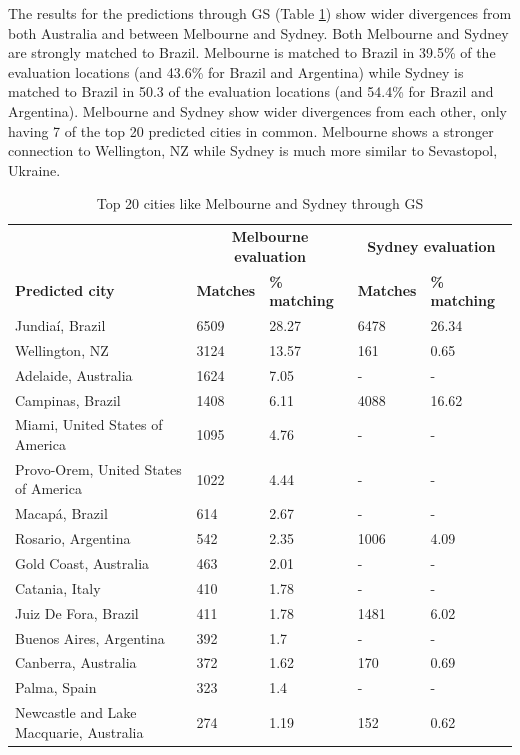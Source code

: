 \documentclass[sageh,times]{sagej}
\begin{document}
The results for the predictions through GS (Table \ref{tab:melbournesydneyGS}) show wider divergences from both Australia and between Melbourne and Sydney. Both Melbourne and Sydney are strongly matched to Brazil. Melbourne is matched to Brazil in 39.5\% of the evaluation locations (and 43.6\% for Brazil and Argentina) while Sydney is matched to Brazil in 50.3 of the evaluation locations (and 54.4\% for Brazil and Argentina). Melbourne and Sydney show wider divergences from each other, only having 7 of the top 20 predicted cities in common. Melbourne shows a stronger connection to Wellington, NZ while Sydney is much more similar to Sevastopol, Ukraine.

\begin{table}[!htbp]
\caption{Top 20 cities like Melbourne and Sydney through GS \label{tab:melbournesydneyGS}}     
\begin{tabular}{| l | l |l| l | l|}
\hline
 \hline    &  \multicolumn{2}{c|}{\textbf{Melbourne evaluation}} & \multicolumn{2}{c|}{\textbf{Sydney evaluation}}  \\  
\textbf{Predicted city} & \textbf{Matches} & \textbf{\% matching}  & \textbf{Matches} & \textbf{\% matching}\\ \hline
Jundia\'{i}, Brazil & 6509 & 28.27 & 6478 & 26.34 \\ \hline
Wellington, NZ & 3124 & 13.57 & 161 & 0.65 \\ \hline
Adelaide, Australia & 1624 & 7.05 &-&- \\ \hline
Campinas, Brazil & 1408 & 6.11 & 4088 & 16.62 \\ \hline
Miami, United States of America & 1095 & 4.76 &-&- \\ \hline
Provo-Orem, United States of America & 1022 & 4.44 &-&- \\ \hline
Macap\'{a}, Brazil & 614 & 2.67 &-&- \\ \hline
Rosario, Argentina & 542 & 2.35 & 1006 & 4.09 \\ \hline
Gold Coast, Australia & 463 & 2.01 &-&- \\ \hline
Catania, Italy & 410 & 1.78 &-&- \\ \hline
Juiz De Fora, Brazil & 411 & 1.78 & 1481 & 6.02 \\ \hline
Buenos Aires, Argentina & 392 & 1.7 &-&- \\ \hline
Canberra, Australia & 372 & 1.62 & 170 & 0.69 \\ \hline
Palma, Spain & 323 & 1.4 &-&- \\ \hline
Newcastle and Lake Macquarie, Australia & 274 & 1.19 & 152 & 0.62 \\ \hline

\end{tabular}
\end{table}
\end{document}
